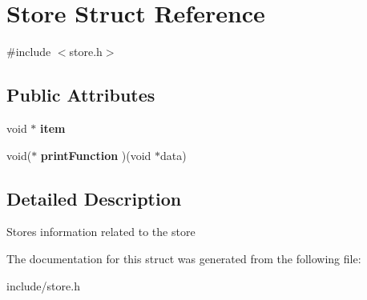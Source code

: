 \hypertarget{structStore}{}\section{Store Struct Reference}
\label{structStore}


{\ttfamily \#include $<$store.\+h$>$}

\subsection*{Public Attributes}
\begin{DoxyCompactItemize}
\item 
\mbox{\label{structStore_a2b079c1f7ee0028e06ec516ac733d5ec}} 
void $\ast$ {\bfseries item}
\item 
\mbox{\label{structStore_ad313fb223831da3b9f405c2bcd3ea373}} 
void($\ast$ {\bfseries print\+Function} )(void $\ast$data)
\end{DoxyCompactItemize}


\subsection{Detailed Description}
Stores information related to the store 

The documentation for this struct was generated from the following file\+:\begin{DoxyCompactItemize}
\item 
include/store.\+h\end{DoxyCompactItemize}
